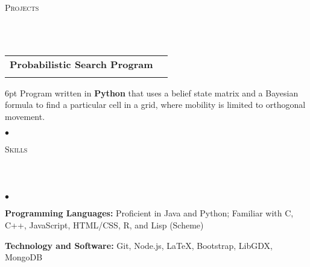 \documentclass[12pt]{article}
\makeatletter
\newcommand{\lineunder}{
	\vspace*{-8pt} \\ 
	\hspace*{-18pt} 
	\hrulefill \\
}
\newcommand{\header}[1]{
	\vspace*{2pt}
	{\hspace*{-14pt}\vspace*{6pt} \textsc{#1}} 
	\vspace*{-6pt} 
	\lineunder
}
\newenvironment{achievements}{
  \begin{list}{$\bullet$}{
  	\topsep 0pt \itemsep -4pt}}
  	{\vspace*{2pt}\end{list}
}
\newcommand{\subheading}[4]{
 	\vspace{5pt}
    	\begin{tabular*}{1.01\textwidth}{l@{\extracolsep{\fill}}r}
      		\textbf{#1} & #2 \\
      		\textit{\small#3} & \textit{\small #4} \\
    	\end{tabular*}\vspace{-5pt}
}
\makeatother
\begin{document}
\header{Projects}

\subheading{Probabilistic Search Program}{}{}{}
	\vspace{-15pt}	
	\begin{adjustwidth}{6pt}{}
	Program written in \textbf{Python} that uses a belief state matrix and a Bayesian formula to find a particular cell in a grid, where mobility is limited to orthogonal movement.
	\end{adjustwidth}
	\begin{achievements}
		\item 
	\end{achievements}
	
\header{Skills}
	\begin{achievements}
		\item{\bf Programming Languages:} Proficient in Java and Python; Familiar with C, C++, JavaScript, HTML/CSS, R, and Lisp (Scheme)
		\item{\bf Technology and Software:} Git, Node.js, \LaTeX, Bootstrap, LibGDX, MongoDB
	\end{achievements}
\end{document}
